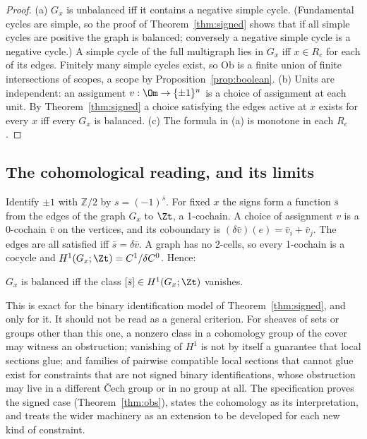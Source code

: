 \begin{proof}
(a) $G_x$ is unbalanced iff it contains a negative simple cycle. (Fundamental cycles are simple, so the proof of Theorem~\ref{thm:signed} shows that if all simple cycles are positive the graph is balanced; conversely a negative simple cycle is a negative cycle.) A simple cycle of the full multigraph lies in $G_x$ iff $x\in R_e$ for each of its edges. Finitely many simple cycles exist, so $\mathrm{Ob}$ is a finite union of finite intersections of scopes, a scope by Proposition~\ref{prop:boolean}.
(b) Units are independent: an assignment $v:\Om\to\{\pm1\}^n$ is a choice of assignment at each unit. By Theorem~\ref{thm:signed} a choice satisfying the edges active at $x$ exists for every $x$ iff every $G_x$ is balanced.
(c) The formula in (a) is monotone in each $R_e$.
\end{proof}

\subsection{The cohomological reading, and its limits}

Identify $\pm1$ with $\mathbb Z/2$ by $s=(-1)^{\bar s}$. For fixed $x$ the signs form a function $\bar s$ from the edges of the graph $G_x$ to $\Zt$, a 1-cochain. A choice of assignment $v$ is a 0-cochain $\bar v$ on the vertices, and its coboundary is $(\delta\bar v)(e)=\bar v_i+\bar v_j$. The edges are all satisfied iff $\bar s=\delta\bar v$. A graph has no 2-cells, so every 1-cochain is a cocycle and $H^1(G_x;\Zt)=C^1/\delta C^0$. Hence:

\begin{proposition}\label{prop:h1}
$G_x$ is balanced iff the class $[\bar s]\in H^1(G_x;\Zt)$ vanishes.
\end{proposition}

This is exact for the binary identification model of Theorem~\ref{thm:signed}, and only for it. It should not be read as a general criterion. For sheaves of sets or groups other than this one, a nonzero class in a cohomology group of the cover may witness an obstruction; vanishing of $H^1$ is not by itself a guarantee that local sections glue; and families of pairwise compatible local sections that cannot glue exist for constraints that are not signed binary identifications, whose obstruction may live in a different Čech group or in no group at all. The specification proves the signed case (Theorem~\ref{thm:obs}), states the cohomology as its interpretation, and treats the wider machinery as an extension to be developed for each new kind of constraint.


